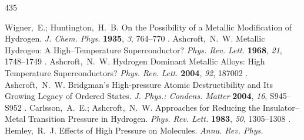 \documentclass[12pt,letterpaper,oneside]{article}
\begin{document}
\begin{mcitethebibliography}{435}
\providecommand*\natexlab[1]{#1}
\providecommand*\mciteSetBstSublistMode[1]{}
\providecommand*\mciteSetBstMaxWidthForm[2]{}
\providecommand*\mciteBstWouldAddEndPuncttrue
  {\def\EndOfBibitem{\unskip.}}
\providecommand*\mciteBstWouldAddEndPunctfalse
  {\let\EndOfBibitem\relax}
\providecommand*\mciteSetBstMidEndSepPunct[3]{}
\providecommand*\mciteSetBstSublistLabelBeginEnd[3]{}
\providecommand*\EndOfBibitem{}
\mciteSetBstSublistMode{f}
\mciteSetBstMaxWidthForm{subitem}{(\alph{mcitesubitemcount})}
\mciteSetBstSublistLabelBeginEnd
  {\mcitemaxwidthsubitemform\space}
  {\relax}
  {\relax}

Wigner,~E.; Huntington,~H.~B. On the Possibility of a Metallic Modification of
  Hydrogen. \emph{J. Chem. Phys.} \textbf{1935}, \emph{3}, 764--770\relax
\mciteBstWouldAddEndPuncttrue
\mciteSetBstMidEndSepPunct{\mcitedefaultmidpunct}
{\mcitedefaultendpunct}{\mcitedefaultseppunct}\relax
\EndOfBibitem
{}
Ashcroft,~N.~W. Metallic Hydrogen: A High--Temperature Superconductor?
  \emph{Phys. Rev. Lett.} \textbf{1968}, \emph{21}, 1748--1749\relax
\mciteBstWouldAddEndPuncttrue
\mciteSetBstMidEndSepPunct{\mcitedefaultmidpunct}
{\mcitedefaultendpunct}{\mcitedefaultseppunct}\relax
\EndOfBibitem
{}
Ashcroft,~N.~W. Hydrogen Dominant Metallic Alloys: High Temperature
  Superconductors? \emph{Phys. Rev. Lett.} \textbf{2004}, \emph{92},
  187002\relax
\mciteBstWouldAddEndPuncttrue
\mciteSetBstMidEndSepPunct{\mcitedefaultmidpunct}
{\mcitedefaultendpunct}{\mcitedefaultseppunct}\relax
\EndOfBibitem
{}
Ashcroft,~N.~W. Bridgman's High-pressure Atomic Destructibility and Its Growing
  Legacy of Ordered States. \emph{J. Phys.: Condens. Matter} \textbf{2004},
  \emph{16}, S945--S952\relax
\mciteBstWouldAddEndPuncttrue
\mciteSetBstMidEndSepPunct{\mcitedefaultmidpunct}
{\mcitedefaultendpunct}{\mcitedefaultseppunct}\relax
\EndOfBibitem
{}
Carlsson,~A.~E.; Ashcroft,~N.~W. Approaches for Reducing the Insulator--Metal
  Transition Pressure in Hydrogen. \emph{Phys. Rev. Lett.} \textbf{1983},
  \emph{50}, 1305--1308\relax
\mciteBstWouldAddEndPuncttrue
\mciteSetBstMidEndSepPunct{\mcitedefaultmidpunct}
{\mcitedefaultendpunct}{\mcitedefaultseppunct}\relax
\EndOfBibitem
{}
Hemley,~R.~J. Effects of High Pressure on Molecules. \emph{Annu. Rev. Phys.
}
\end{mcitethebibliography}
\end{document}
